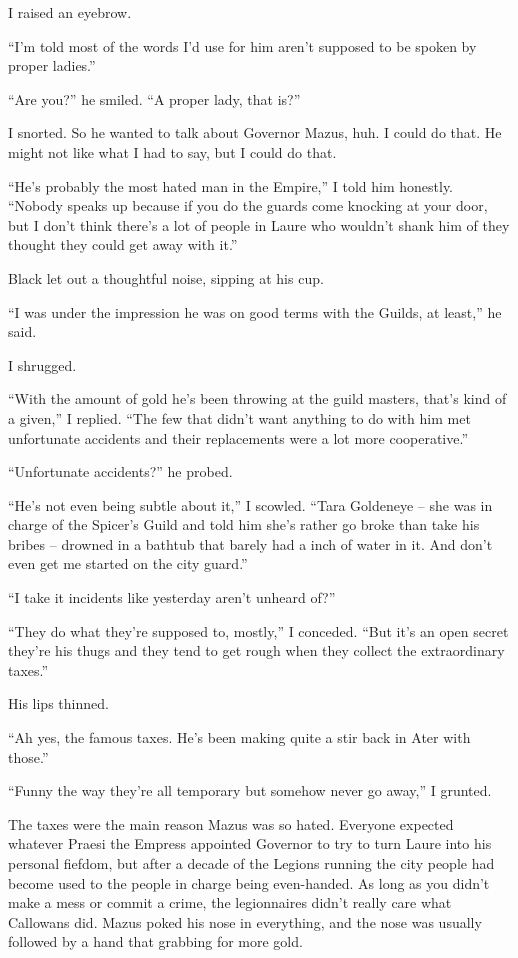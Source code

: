 \documentclass[12pt, openany]{book}
\begin{document}
I raised an eyebrow.

“I’m told most of the words I’d use for him aren’t supposed to be spoken by proper ladies.”

“Are you?” he smiled. “A proper lady, that is?”

I snorted. So he wanted to talk about Governor Mazus, huh. I could do that. He might not like what I had to say, but I could do that.

“He’s probably the most hated man in the Empire,” I told him honestly. “Nobody speaks up because if you do the guards come knocking at your door, but I don’t think there’s a lot of people in Laure who wouldn’t shank him of they thought they could get away with it.”

Black let out a thoughtful noise, sipping at his cup.

“I was under the impression he was on good terms with the Guilds, at least,” he said.

I shrugged.

“With the amount of gold he’s been throwing at the guild masters, that’s kind of a given,” I replied. “The few that didn’t want anything to do with him met unfortunate accidents and their replacements were a lot more cooperative.”

“Unfortunate accidents?” he probed.

“He’s not even being subtle about it,” I scowled. “Tara Goldeneye – she was in charge of the Spicer’s Guild and told him she’s rather go broke than take his bribes – drowned in a bathtub that barely had a inch of water in it. And don’t even get me started on the city guard.”

“I take it incidents like yesterday aren’t unheard of?”

“They do what they’re supposed to, mostly,” I conceded. “But it’s an open secret they’re his thugs and they tend to get rough when they collect the extraordinary taxes.”

His lips thinned.

“Ah yes, the famous taxes. He’s been making quite a stir back in Ater with those.”

“Funny the way they’re all temporary but somehow never go away,” I grunted.

The taxes were the main reason Mazus was so hated. Everyone expected whatever Praesi the Empress appointed Governor to try to turn Laure into his personal fiefdom, but after a decade of the Legions running the city people had become used to the people in charge being even-handed. As long as you didn’t make a mess or commit a crime, the legionnaires didn’t really care what Callowans did. Mazus poked his nose in everything, and the nose was usually followed by a hand that grabbing for more gold. 
\end{document}
